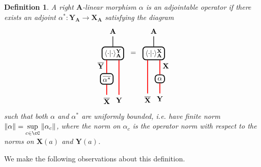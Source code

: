 \documentclass[11pt,reqno]{amsart}
\newcommand{\bb}[1]{\mathbf{#1}}
\newcommand{\bbover}[1]{\mathbf{\overline{#1}}}
\numberwithin{equation}{section}
\theoremstyle{plain}
\newtheorem{defn}[thm]{Definition}
\begin{document}
\begin{defn}
A right $\bb A$-linear morphism $\alpha$ is an adjointable operator if there exists an adjoint $\alpha^* \colon \bb Y_{\bb A} \to \bb X_{\bb A}$ satisfying the diagram
\begin{equation}
\label{eq:AdjOp}
\begin{tikzpicture}[baseline={(current bounding box.center)}, thick]
\draw (0,0) node[draw=black, fill=white, very thick, rounded corners, baseline=center] (a){$\langle \cdot | \cdot \rangle_{\bb A}^{\bb Y}$};
\draw ([xshift=-0.3cm, yshift=-1.25cm]a) node[draw=black, fill=white, very thick, rounded corners, baseline=center] (b){$\overline{\alpha^*}$};
\draw (a.north) --node[pos=1, above]{$\bb A$} ++(0, 0.5);
\draw [red, very thick] ([xshift=-0.3cm]a.south) to node[pos=0.4, left, black]{$\bbover Y$} (b.north);
\draw [red, very thick] (b.south) --node[pos=1, below, black]{$\bbover X$}++(0, -0.5) coordinate (c);
\draw [red, very thick] ([xshift=0.3cm]a.south) to node[pos=1, below, black]{$\bb Y$} ([xshift=0.6cm]c);

\node[] (d) at ([xshift=1cm]a) {$=$};

\draw ([xshift=1cm]d) node[draw=black, fill=white, very thick, rounded corners, baseline=center] (e){$\langle \cdot | \cdot \rangle_{\bb A}^{\bb X}$};
\draw ([xshift=0.3cm, yshift=-1.25cm]e) node[draw=black, fill=white, very thick, rounded corners, baseline=center] (f){$\alpha$};
\draw (e.north) --node[pos=1, above]{$\bb A$} ++(0, 0.5);
\draw [red, very thick] ([xshift=0.3cm]e.south) to node[pos=0.4, right, black]{$\bb X$} (f.north);
\draw [red, very thick] (f.south) --node[pos=1, below, black]{$\bb Y$}++(0, -0.5) coordinate (g);
\draw [red, very thick] ([xshift=-0.3cm]e.south) to node[pos=1, below, black]{$\bbover X$} ([xshift=-0.6cm]g);
\end{tikzpicture}
\end{equation}
such that both $\alpha$ and $\alpha^*$ are uniformly bounded, i.e. have finite norm $\|\alpha\| = \sup \limits_{c \in \cC} \|\alpha_c\|$, where the norm on $\alpha_c$ is the operator norm with respect to the norms on $\bb X(a)$ and $\bb Y(a)$.
\end{defn}

We make the following observations about this definition.
\end{document}
